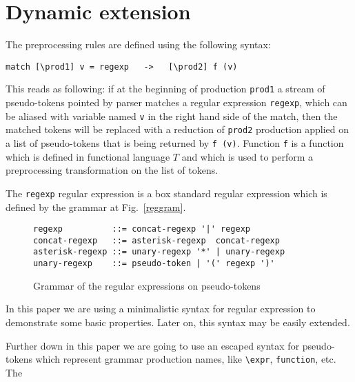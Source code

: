 \section{\label{sec:dynext}Dynamic extension}

The preprocessing rules are defined using the following syntax:
\begin{verbatim}
match [\prod1] v = regexp   ->   [\prod2] f (v)
\end{verbatim}
This reads as following: if at the beginning of production \verb|prod1|
a stream of pseudo-tokens pointed by parser matches a regular expression
\verb|regexp|, which can be aliased with variable named \verb|v| in the
right hand side of the match, then the matched tokens will be replaced 
with a reduction of \verb|prod2| production applied on a list of 
pseudo-tokens that is being returned by \verb|f (v)|.  Function \verb|f|
is a function which is defined in functional language $T$ and which
is used to perform a preprocessing transformation on the list of 
tokens.  

The \verb|regexp| regular expression is a box standard regular
expression which is defined by the grammar at Fig.~\ref{reggram}.
\begin{figure}[h!]
\begin{verbatim}
regexp          ::= concat-regexp '|' regexp
concat-regexp   ::= asterisk-regexp  concat-regexp
asterisk-regexp ::= unary-regexp '*' | unary-regexp
unary-regexp    ::= pseudo-token | '(' regexp ')'
\end{verbatim}
\caption{\label{fig:reggram}Grammar of the regular expressions on
pseudo-tokens}
\end{figure}
In this paper we are using a minimalistic syntax for regular expression
to demonstrate some basic properties.  Later on, this syntax may be 
easily extended.

Further down in this paper we are going to use an escaped syntax 
for pseudo-tokens which represent grammar production names, like
\verb|\expr|, \verb|function|, etc.  The 
